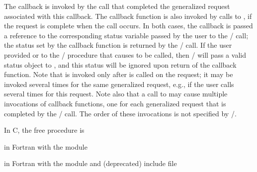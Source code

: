 The  callback is invoked by the 
% 
% 
% 
% 
% 
%
%
%
 call that
completed the generalized request associated with this callback.  
The callback function
is also 
invoked by calls to , if the request is
complete when the call occurs.  In 
both
cases, the callback is passed a reference to the corresponding status variable
passed by the user to the \MPI/ call; the status set by the callback
function is returned by the \MPI/ call. 
If the user provided  or
 to the \MPI/ procedure that causes
 to be called, then \MPI/ will pass
a valid status object to , and this status will be
ignored upon return of the callback function.  
Note that 
is invoked only after 
 is called on the request; 
it may be invoked several times for
the same generalized request, e.g., if the user calls
 several times for this request.
Note also that a call to 
%
%
%
%
 may cause multiple
invocations of
 callback functions, one for each
generalized request that is completed by the \MPI/ call.  The order of
these invocations is not specified by \mpi/.

In C, the free procedure is


\par\noindent
in Fortran with the  module


\par\noindent
in Fortran with the  module and (deprecated)  include file


